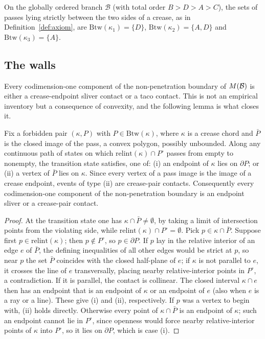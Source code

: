 \begin{corollary}\label{cor:btw}
On the globally ordered branch $\mathcal B$ (with total order $B>D>A>C$), the sets of passes lying strictly between the two sides of a crease, as in Definition~\textup{\ref{def:axiom}}, are $\mathrm{Btw}(\kappa_1)=\{D\}$, $\mathrm{Btw}(\kappa_2)=\{A,D\}$ and $\mathrm{Btw}(\kappa_3)=\{A\}$.
\end{corollary}

\subsection{The walls}

Every codimension-one component of the non-penetration boundary of $M(\mathcal{B})$ is either a crease-endpoint sliver contact or a taco contact. This is not an empirical inventory but a consequence of convexity, and the following lemma is what closes it.

\begin{lemma}\label{lem:wallcat}
Fix a forbidden pair $(\kappa,P)$ with $P\in\mathrm{Btw}(\kappa)$, where $\kappa$ is a crease chord and $\bar P$ is the closed image of the pass, a convex polygon, possibly unbounded. Along any continuous path of states on which $\mathrm{relint}(\kappa)\cap P^\circ$ passes from empty to nonempty, the transition state satisfies, one of:
\textup{(i)} an endpoint of $\kappa$ lies on $\partial P$; or
\textup{(ii)} a vertex of $\bar P$ lies on $\kappa$.
Since every vertex of a pass image is the image of a crease endpoint, events of type \textup{(ii)} are crease-pair contacts. Consequently every codimension-one component of the non-penetration boundary is an endpoint sliver or a crease-pair contact.
\end{lemma}

\begin{proof}
At the transition state one has $\kappa\cap\bar P\ne\emptyset$, by taking a limit of intersection points from the violating side, while $\mathrm{relint}(\kappa)\cap P^\circ=\emptyset$. Pick $p\in\kappa\cap\bar P$. Suppose first $p\in\mathrm{relint}(\kappa)$; then $p\notin P^\circ$, so $p\in\partial P$. If $p$ lay in the relative interior of an edge $e$ of $\bar P$, the defining inequalities of all other edges would be strict at $p$, so near $p$ the set $\bar P$ coincides with the closed half-plane of $e$; if $\kappa$ is not parallel to $e$, it crosses the line of $e$ transversally, placing nearby relative-interior points in $P^\circ$, a contradiction. If it is parallel, the contact is collinear. The closed interval $\kappa\cap e$ then has an endpoint that is an endpoint of $\kappa$ or an endpoint of $e$ (also when $e$ is a ray or a line). These give \textup{(i)} and \textup{(ii)}, respectively. If $p$ was a vertex to begin with, \textup{(ii)} holds directly. Otherwise every point of $\kappa\cap\bar P$ is an endpoint of $\kappa$; such an endpoint cannot lie in $P^\circ$, since openness would force nearby relative-interior points of $\kappa$ into $P^\circ$, so it lies on $\partial P$, which is case \textup{(i)}.
\end{proof}

